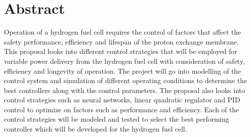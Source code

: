 \section*{Abstract}
\label{sec:}
Operation of a hydrogen fuel cell requires the control of factors that affect the safety performance, efficiency and lifespan of the proton exchange membrane. This proposal  looks into different control strategies that will be employed for variable power delivery from the hydrogen fuel cell with consideration of safety, efficiency and longevity of operation.
The project will go into modelling of the control system and simulation of different operating conditions to determine the best controllers along with the control parameters. The proposal also  looks into control strategies such as neural networks, linear quadratic regulator and PID control to optimize on factors such as performance and efficiency. Each of the control strategies will be modeled and tested to select the best performing controller which will be developed for the hydrogen fuel cell.




